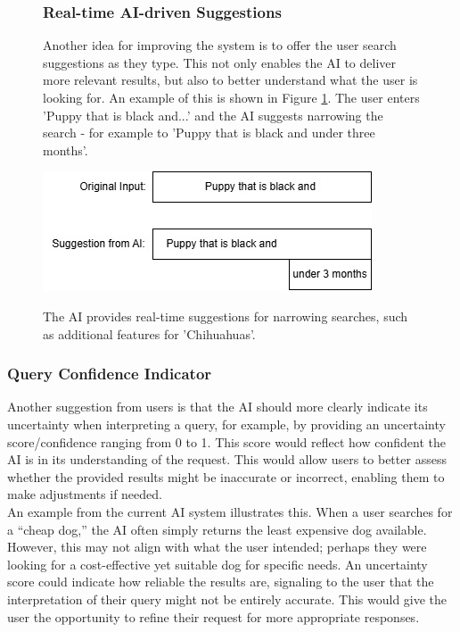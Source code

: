\documentclass[../../submission.tex]{subfiles}
\begin{document}
\begin{figure}[h]
\centering
\begin{minipage}{0.35\textwidth}
    \subsubsection{Real-time AI-driven Suggestions}
    Another idea for improving the system is to offer the user search suggestions as they type. 
    This not only enables the AI to deliver more relevant results, but also to better understand what the user is looking for.
    An example of this is shown in Figure \ref{fig:suggestions}. The user enters 'Puppy that is black and...' and the AI suggests narrowing the 
    search - for example to 'Puppy that is black and under three months'.
\end{minipage}
\hfill
\begin{minipage}{0.55\textwidth}
    \includegraphics[width=\textwidth]{images/vorschlag}
    \caption{The AI provides real-time suggestions for narrowing searches, such as additional features for 'Chihuahuas'.}
    \Description{}
    \label{fig:suggestions}
\end{minipage}
\end{figure}
 

 
 \subsubsection{Query Confidence Indicator}   
 
 Another suggestion from users is that the AI should more clearly indicate its uncertainty 
 when interpreting a query, for example, by providing an uncertainty score/confidence ranging from 
 0 to 1. This score would reflect how confident the AI is in its understanding of the 
 request. This would allow users to better assess whether the provided results might 
 be inaccurate or incorrect, enabling them to make adjustments if needed.\\
 An example from the current AI system illustrates this. When a user searches for 
 a “cheap dog,” the AI often simply returns the least expensive dog available. 
 However, this may not align with what the user intended; perhaps they were looking 
 for a cost-effective yet suitable dog for specific needs. An uncertainty score could 
 indicate how reliable the results are, signaling to the user that the interpretation 
 of their query might not be entirely accurate. This would give the user the opportunity 
 to refine their request for more appropriate responses.
\end{document}

